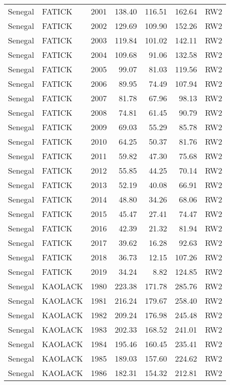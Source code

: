 \begin{longtable}{lllrrrl}
  Senegal & FATICK & 2001 & 138.40 & 116.51 & 162.64 & RW2 \\ 
  Senegal & FATICK & 2002 & 129.69 & 109.90 & 152.26 & RW2 \\ 
  Senegal & FATICK & 2003 & 119.84 & 101.02 & 142.11 & RW2 \\ 
  Senegal & FATICK & 2004 & 109.68 & 91.06 & 132.58 & RW2 \\ 
  Senegal & FATICK & 2005 & 99.07 & 81.03 & 119.56 & RW2 \\ 
  Senegal & FATICK & 2006 & 89.95 & 74.49 & 107.94 & RW2 \\ 
  Senegal & FATICK & 2007 & 81.78 & 67.96 & 98.13 & RW2 \\ 
  Senegal & FATICK & 2008 & 74.81 & 61.45 & 90.79 & RW2 \\ 
  Senegal & FATICK & 2009 & 69.03 & 55.29 & 85.78 & RW2 \\ 
  Senegal & FATICK & 2010 & 64.25 & 50.37 & 81.76 & RW2 \\ 
  Senegal & FATICK & 2011 & 59.82 & 47.30 & 75.68 & RW2 \\ 
  Senegal & FATICK & 2012 & 55.85 & 44.25 & 70.14 & RW2 \\ 
  Senegal & FATICK & 2013 & 52.19 & 40.08 & 66.91 & RW2 \\ 
  Senegal & FATICK & 2014 & 48.80 & 34.26 & 68.06 & RW2 \\ 
  Senegal & FATICK & 2015 & 45.47 & 27.41 & 74.47 & RW2 \\ 
  Senegal & FATICK & 2016 & 42.39 & 21.32 & 81.94 & RW2 \\ 
  Senegal & FATICK & 2017 & 39.62 & 16.28 & 92.63 & RW2 \\ 
  Senegal & FATICK & 2018 & 36.73 & 12.15 & 107.26 & RW2 \\ 
  Senegal & FATICK & 2019 & 34.24 & 8.82 & 124.85 & RW2 \\ 
  Senegal & KAOLACK & 1980 & 223.38 & 171.78 & 285.76 & RW2 \\ 
  Senegal & KAOLACK & 1981 & 216.24 & 179.67 & 258.40 & RW2 \\ 
  Senegal & KAOLACK & 1982 & 209.24 & 176.98 & 245.48 & RW2 \\ 
  Senegal & KAOLACK & 1983 & 202.33 & 168.52 & 241.01 & RW2 \\ 
  Senegal & KAOLACK & 1984 & 195.46 & 160.45 & 235.41 & RW2 \\ 
  Senegal & KAOLACK & 1985 & 189.03 & 157.60 & 224.62 & RW2 \\ 
  Senegal & KAOLACK & 1986 & 182.31 & 154.32 & 212.81 & RW2 \\ 

\end{longtable}
